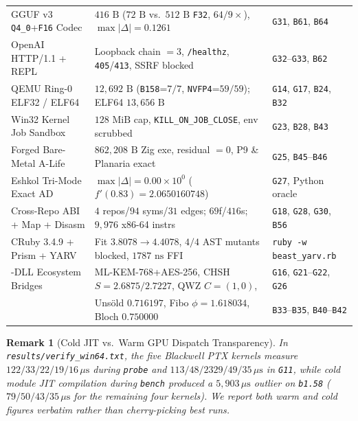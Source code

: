 \documentclass[11pt,letterpaper]{amsart}
\newtheorem{remark}[theorem]{Remark}
\newcommand{\code}[1]{{\small\texttt{#1}}}
\begin{document}
\begin{table}[t]
\begin{tabular}{@{} >{\raggedright\arraybackslash}p{3.6cm} >{\raggedright\arraybackslash}p{7.1cm} >{\raggedright\arraybackslash}p{3.2cm} @{}}
GGUF v3 \code{Q4\_0}+\code{F16} Codec & $416\text{ B}$ ($72\text{ B}$ vs.\ $512\text{ B}$ \code{F32}, $64/9\times$), $\max|\Delta|=0.1261$ & \code{G31}, \code{B61}, \code{B64} \\
OpenAI HTTP/1.1 + REPL & Loopback chain $=3$, \code{/healthz}, \code{405}/\code{413}, SSRF blocked & \code{G32}--\code{G33}, \code{B62} \\
QEMU Ring-0 ELF32 / ELF64 & $12{,}692\text{ B}$ (\code{B158}=$7/7$, \code{NVFP4}=$59/59$); ELF64 $13{,}656\text{ B}$ & \code{G14}, \code{G17}, \code{B24}, \code{B32} \\
Win32 Kernel Job Sandbox & $128\text{ MiB}$ cap, \code{KILL\_ON\_JOB\_CLOSE}, env scrubbed & \code{G23}, \code{B28}, \code{B43} \\
Forged Bare-Metal A-Life & $862{,}208\text{ B}$ Zig exe, residual $=0$, P9 \& Planaria exact & \code{G25}, \code{B45}--\code{B46} \\
Eshkol Tri-Mode Exact AD & $\max|\Delta| = 0.00 \times 10^0$ ($f'(0.83)=2.0650160748$) & \code{G27}, Python oracle \\
Cross-Repo ABI + Map + Disasm & $4$ repos/$94$ syms/$31$ edges; $69$f/$416$s; $9{,}976$ x86-64 instrs & \code{G18}, \code{G28}, \code{G30}, \code{B56} \\
CRuby 3.4.9 + Prism + YARV & Fit $3.8078 \to 4.4078$, $4/4$ AST mutants blocked, $1787\text{ ns}$ FFI & \code{ruby -w beast\_yarv.rb} \\
12-DLL Ecosystem Bridges & ML-KEM-768+AES-256, CHSH $S{=}2.6875/2.7227$, QWZ $C{=}(1,0)$, & \code{G16}, \code{G21}--\code{G22}, \code{G26} \\
& Uns\"old $0.716197$, Fibo $\phi{=}1.618034$, Bloch $0.750000$ & \code{B33}--\code{B35}, \code{B40}--\code{B42} \\
\bottomrule
\end{tabular}
\end{table}

\begin{remark}[Cold JIT vs.\ Warm GPU Dispatch Transparency]
In \code{results/verify\_win64.txt}, the five Blackwell PTX kernels measure
$122/33/22/19/16\,\mu\text{s}$ during \code{probe} and $113/48/2329/49/35\,\mu\text{s}$
in \code{G11}, while cold module JIT compilation during \code{bench} produced a
$5{,}903\,\mu\text{s}$ outlier on \code{b1.58} ($79/50/43/35\,\mu\text{s}$ for the
remaining four kernels). We report both warm and cold figures verbatim rather than
cherry-picking best runs.
\end{remark}
\end{document}
